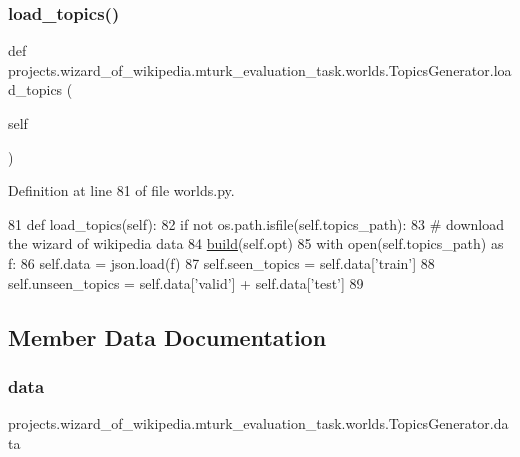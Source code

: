 \subsubsection{\texorpdfstring{load\+\_\+topics()}{load\_topics()}}
{\footnotesize\ttfamily def projects.\+wizard\+\_\+of\+\_\+wikipedia.\+mturk\+\_\+evaluation\+\_\+task.\+worlds.\+Topics\+Generator.\+load\+\_\+topics (\begin{DoxyParamCaption}\item[{}]{self }\end{DoxyParamCaption})}



Definition at line 81 of file worlds.\+py.


\begin{DoxyCode}
81     \textcolor{keyword}{def }load\_topics(self):
82         \textcolor{keywordflow}{if} \textcolor{keywordflow}{not} os.path.isfile(self.topics\_path):
83             \textcolor{comment}{# download the wizard of wikipedia data}
84             \hyperlink{namespaceparlai_1_1mturk_1_1tasks_1_1talkthewalk_1_1download_a8c0fbb9b6dfe127cb8c1bd6e7c4e33fd}{build}(self.opt)
85         with open(self.topics\_path) \textcolor{keyword}{as} f:
86             self.data = json.load(f)
87         self.seen\_topics = self.data[\textcolor{stringliteral}{'train'}]
88         self.unseen\_topics = self.data[\textcolor{stringliteral}{'valid'}] + self.data[\textcolor{stringliteral}{'test'}]
89 
\end{DoxyCode}


\subsection{Member Data Documentation}
\mbox{\label{classprojects_1_1wizard__of__wikipedia_1_1mturk__evaluation__task_1_1worlds_1_1TopicsGenerator_a55a55c6d796feb5538175f71511ef009}} 
\subsubsection{\texorpdfstring{data}{data}}
{\footnotesize\ttfamily projects.\+wizard\+\_\+of\+\_\+wikipedia.\+mturk\+\_\+evaluation\+\_\+task.\+worlds.\+Topics\+Generator.\+data}



